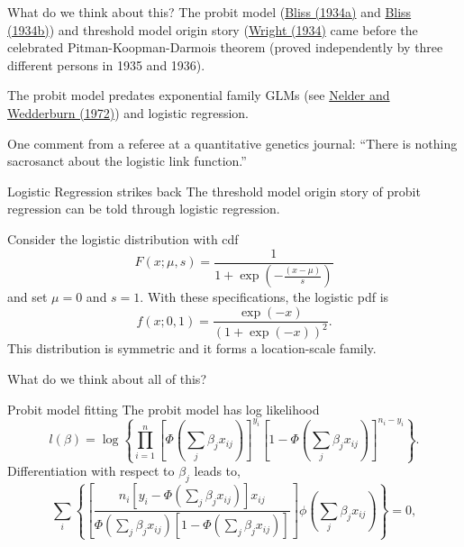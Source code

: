 \documentclass[
  ignorenonframetext,
]{beamer}
\begin{document}
\begin{frame}{What do we think about this?}
\protect\hypertarget{what-do-we-think-about-this}{}
The probit model
(\href{https://www.science.org/doi/pdf/10.1126/science.79.2037.38?casa_token=tvZZcb5udQ8AAAAA:in5nFvRZcC5nMa1nLBZy6vX74HWPlkLItoVXaXEPJBeyrfbkXh0EQ15ZyJa3DmIl1aogpqgI9RZmDb4}{Bliss
(1934a)} and
\href{https://www.science.org/doi/pdf/10.1126/science.79.2053.409?casa_token=dacDGcK21xMAAAAA:fBSJpMPx6lhiIG9HEOrauhcVYci_qjBq_KGy2xJG1wPZtPLjC4Rajb_RZOmr_d6LQn-6ZhoYziUTTZw}{Bliss
(1934b)}) and threshold model origin story
(\href{https://www.ncbi.nlm.nih.gov/pmc/articles/PMC1208511/}{Wright
(1934)} came before the celebrated Pitman-Koopman-Darmois theorem
(proved independently by three different persons in 1935 and 1936).

\vspace{12pt}

The probit model predates exponential family GLMs (see
\href{https://rss.onlinelibrary.wiley.com/doi/abs/10.2307/2344614?casa_token=WoS6w5XhILwAAAAA:KwIYkqavUBTKOt2gE79Z815vQ4FKtUrzduzpPcBh472-X-Rntqiwqdt5XQNo-uDNw8EYigIrkGRUyBHi}{Nelder
and Wedderburn (1972)}) and logistic regression.

\vspace{12pt}

One comment from a referee at a quantitative genetics journal: ``There
is nothing sacrosanct about the logistic link function.''
\end{frame}

\begin{frame}{Logistic Regression strikes back}
\protect\hypertarget{logistic-regression-strikes-back}{}
The threshold model origin story of probit regression can be told
through logistic regression.

\vspace{12pt}

Consider the logistic distribution with cdf \[
  F(x; \mu,s) = \frac{1}{1 + \exp\left(-\frac{(x-\mu)}{s}\right)}
\] and set \(\mu = 0\) and \(s = 1\). With these specifications, the
logistic pdf is \[
  f(x; 0,1) = \frac{\exp(-x)}{\left(1 + \exp(-x)\right)^2}.
\] This distribution is symmetric and it forms a location-scale family.
\end{frame}

\begin{frame}{}
\protect\hypertarget{section-9}{}
What do we think about all of this?
\end{frame}

\begin{frame}{Probit model fitting}
\protect\hypertarget{probit-model-fitting}{}
The probit model has log likelihood \[
  l(\beta) = \log\left\{\prod_{i=1}^n\left[\Phi\left(\sum_j \beta_jx_{ij}\right)\right]^{y_i}
  \left[1 - \Phi\left(\sum_j \beta_jx_{ij}\right)\right]^{n_i - y_i}\right\}.
\] Differentiation with respect to \(\beta_j\) leads to, \[
  \sum_{i}\left\{\left[\frac{n_i\left[y_i - \Phi\left(\sum_j\beta_j x_{ij}\right)\right]x_{ij}}
  {\Phi\left(\sum_j\beta_j x_{ij}\right)\left[1 - \Phi\left(\sum_j\beta_j x_{ij}\right)\right]}\right] \phi\left(\sum_j\beta_j x_{ij}\right)\right\} = 0,
\]
\end{frame}
\end{document}
